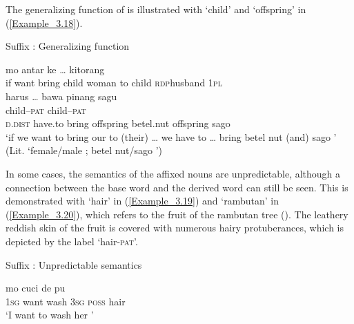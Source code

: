 The generalizing function of  is illustrated with  ‘child’ and  ‘offspring’ in (\ref{Example_3.18}).



\begin{styleExampleTitle}
{Suffix : Generalizing function}
\end{styleExampleTitle}
\ea
\label{Example_3.18}
 {{mo}} {antar} {{}} {{}} {ke} {} {{}} {{\ldots}} {kitorang}\\ %
 if  {want}  bring  {child}  {woman}  to  child  {\textsc{rdp}{\Tilde}husband}  {}  \textsc{1pl}\\
 
   {harus}  {\ldots}  {bawa}    {pinang}    {sagu}\\
 {} {} {} {} child–\textsc{pat} {} child–\textsc{pat} {} \\
  {\textsc{d.dist}} {have.to} {}   {bring}  {offspring}  {betel.nut}  {offspring}  {sago}\\
 ‘if we want to bring our  to (their)  {\ldots} we have to {\ldots} bring betel nut  (and) sago ’ (Lit. ‘female/male ; betel nut/sago ’) \textstyleExampleSource{[081110-005-CvPr.0055-0057]}
\z


In some cases, the semantics of the affixed nouns are unpredictable, although a connection between the base word and the derived word can still be seen. This is demonstrated with  ‘hair’ in (\ref{Example_3.19}) and  ‘rambutan’ in (\ref{Example_3.20}), which refers to the fruit of the rambutan tree (). The leathery reddish skin of the fruit is covered with numerous hairy protuberances, which is depicted by the label  ‘hair-\textsc{pat}’.



\begin{styleExampleTitle}
{Suffix : Unpredictable semantics}
\end{styleExampleTitle}

\ea
\label{Example_3.19}
 {mo} {cuci} {de} {pu} {}\\ %
 \textsc{1sg}  want  wash  \textsc{3sg}  \textsc{poss}  hair\\
\glt 
‘I want to wash her ’ \textstyleExampleSource{[081025-001-CvHt.0006]}
\z

